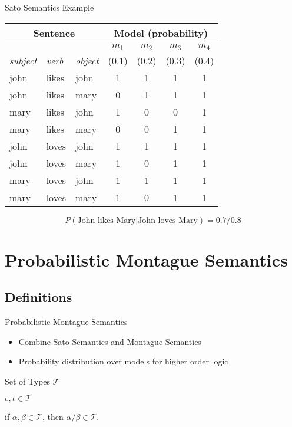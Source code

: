 \documentclass{beamer}
\newlength{\wideitemsep}
\let\olditem\item
\renewcommand{\item}{\setlength{\itemsep}{\wideitemsep}\olditem}
\begin{document}
\begin{frame}{Sato Semantics Example}
\begin{center}
\begin{tabular}{|l|l|l||c|c|c|c|}
\hline
\multicolumn{3}{|c||}{Sentence} & \multicolumn{4}{c|}{Model (probability)}\\
\hline
& & & $m_1$& $m_2$& $m_3$& $m_4$\\
\emph{subject} & \emph{verb} & \emph{object} & (0.1)& (0.2)& (0.3)& (0.4)\\
\hline
john & likes & john & 1 & 1 & 1 & 1\\
john & likes & mary & 0 & 1 & 1 & 1\\
mary & likes & john & 1 & 0 & 0 & 1\\
mary & likes & mary & 0 & 0 & 1 & 1\\
john & loves & john & 1 & 1 & 1 & 1\\
john & loves & mary & 1 & 0 & 1 & 1\\
mary & loves & john & 1 & 1 & 1 & 1\\
mary & loves & mary & 1 & 0 & 1 & 1\\
\hline
\end{tabular}
\end{center}
$$P(\text{John likes Mary}|\text{John loves Mary}) = 0.7/0.8 $$
\end{frame}

\section{Probabilistic Montague Semantics}

\subsection{Definitions}

\begin{frame}{Probabilistic Montague Semantics}
\begin{itemize}
\item Combine Sato Semantics and Montague Semantics
\item Probability distribution over models for higher order logic
\end{itemize}
\end{frame}

\begin{frame}{Set of Types $\mathcal{T}$}
\begin{description}
\item [Basic types:] $e,t\in \mathcal{T}$
\item[Complex types:]  if $\alpha, \beta\in \mathcal{T}$, then $\alpha/\beta\in \mathcal{T}$.
\end{description}
\end{frame}
\end{document}
